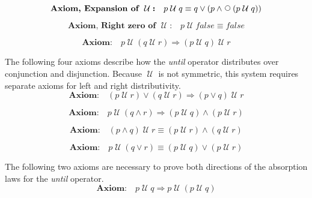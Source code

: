 \documentclass[fleqn, leqno]{article}
\newcommand{\impl}{\ensuremath{\Rightarrow}}        %
\newcommand{\Until}{\;\mathcal{U}\;}
\newcommand{\Next}{\;\,\text{\raisebox{3.5pt}{\circle{6}}}}
\newcommand{\firstspacer}{\vspace{-26pt}}
\begin{document}
\firstspacer

\begin{equation}\label{E:expansionUntil}
\textbf{Axiom, Expansion of $\Until$:}\quad p \Until q \equiv q \lor (p \land \Next (p \Until q))
\end{equation}

\firstspacer

\begin{equation}\label{E:untilFalse}
\textbf{Axiom, Right zero of $\Until$:}\quad p \Until false \equiv false
\end{equation}

\firstspacer

\begin{equation}\label{E:untilAssocImp}
\textbf{Axiom:}\quad p \Until (q \Until r) \impl (p \Until q) \Until r
\end{equation}

The following four axioms describe how the \textit{until} operator distributes over conjunction and disjunction.
Because $\Until$ is not symmetric, this system requires separate axioms for left and right distributivity.
\begin{equation}\label{E:untilOrImp}
\textbf{Axiom:}\quad (p \Until r) \lor (q \Until r) \impl (p \lor q) \Until r
\end{equation}

\firstspacer

\begin{equation}\label{E:untilAndImp}
\textbf{Axiom:}\quad p \Until (q \land r) \impl (p \Until q) \land (p \Until r)
\end{equation}

\firstspacer

\begin{equation}\label{E:untilAndEquiv}
\textbf{Axiom:}\quad (p \land q) \Until r \equiv (p \Until r) \land (q \Until r)
\end{equation}

\firstspacer

\begin{equation}\label{E:untilOrEquiv}
\textbf{Axiom:}\quad p \Until (q \lor r) \equiv (p \Until q) \lor (p \Until r)
\end{equation}

The following two axioms are necessary to prove both directions of the absorption laws for the \textit{until} operator.
\begin{equation}\label{E:untilIdemAx}
\textbf{Axiom:}\quad p \Until q \impl p \Until (p \Until q)
\end{equation}
\end{document}
